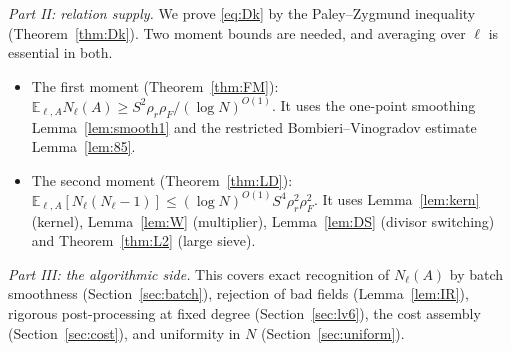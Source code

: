 \documentclass[11pt]{amsart}
\theoremstyle{definition}
\newcommand{\rr}{\rho_r}
\newcommand{\rF}{\rho_F}
\newcommand{\Ex}{\mathbb{E}}
\begin{document}
\emph{Part II: relation supply.} We prove \eqref{eq:Dk} by the Paley--Zygmund inequality
(Theorem~\ref{thm:Dk}). Two moment bounds are needed, and averaging over $\ell$ is essential in both.
\begin{itemize}
\item The first moment (Theorem~\ref{thm:FM}): $\Ex_{\ell,A}N_\ell(A)\ge S^2\rr\rF/(\log N)^{O(1)}$.
  It uses the one-point smoothing Lemma~\ref{lem:smooth1} and the restricted Bombieri--Vinogradov estimate
  Lemma~\ref{lem:85}.
\item The second moment (Theorem~\ref{thm:LD}): $\Ex_{\ell,A}[N_\ell(N_\ell-1)]\le(\log N)^{O(1)}S^4\rr^2\rF^2$.
  It uses Lemma~\ref{lem:kern} (kernel), Lemma~\ref{lem:W} (multiplier), Lemma~\ref{lem:DS} (divisor
  switching) and Theorem~\ref{thm:L2} (large sieve).
\end{itemize}

\emph{Part III: the algorithmic side.} This covers exact recognition of $N_\ell(A)$ by batch smoothness
(Section~\ref{sec:batch}), rejection of bad fields (Lemma~\ref{lem:IR}), rigorous post-processing at fixed degree
(Section~\ref{sec:lv6}), the cost assembly (Section~\ref{sec:cost}), and uniformity in $N$ (Section~\ref{sec:uniform}).
\end{document}
